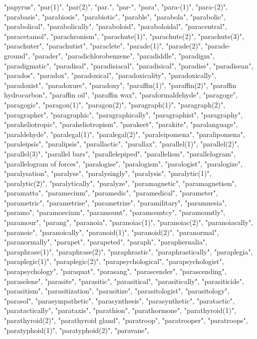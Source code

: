 "papyrus",
"par(1)",
"par(2)",
"par.",
"par-",
"para",
"para-(1)",
"para-(2)",
"parabasis",
"parabiosis",
"parabiotic",
"parable",
"parabola",
"parabolic",
"parabolical",
"parabolically",
"paraboloid",
"paraboloidal",
"paracentral",
"paracetamol",
"parachronism",
"parachute(1)",
"parachute(2)",
"parachute(3)",
"parachuter",
"parachutist",
"paraclete",
"parade(1)",
"parade(2)",
"parade-ground",
"parader",
"paradichlorobenzene",
"paradiddle",
"paradigm",
"paradigmatic",
"paradisal",
"paradisiacal",
"paradisical",
"paradise",
"paradisean",
"parados",
"paradox",
"paradoxical",
"paradoxicality",
"paradoxically",
"paradoxist",
"paradoxure",
"paradoxy",
"paraffin(1)",
"paraffin(2)",
"paraffin hydrocarbon",
"paraffin oil",
"paraffin wax",
"paraformaldehyde",
"paragoge",
"paragogic",
"paragon(1)",
"paragon(2)",
"paragraph(1)",
"paragraph(2)",
"paragrapher",
"paragraphic",
"paragraphically",
"paragraphist",
"paragraphy",
"paraheliotropic",
"paraheliotropism",
"parakeet",
"parakite",
"paralanguage",
"paraldehyde",
"paralegal(1)",
"paralegal(2)",
"paraleipomena",
"paralipomena",
"paraleipsis",
"paralipsis",
"parallactic",
"parallax",
"parallel(1)",
"parallel(2)",
"parallel(3)",
"parallel bars",
"parallelepiped",
"parallelism",
"parallelogram",
"parallelogram of forces",
"paralogise",
"paralogism",
"paralogist",
"paralogize",
"paralysation",
"paralyse",
"paralysingly",
"paralysis",
"paralytic(1)",
"paralytic(2)",
"paralytically",
"paralyze",
"paramagnetic",
"paramagnetism",
"paramatta",
"paramecium",
"paramedic",
"paramedical",
"parameter",
"parametric",
"parametrise",
"parametrize",
"paramilitary",
"paramnesia",
"paramo",
"paramoecium",
"paramount",
"paramountcy",
"paramountly",
"paramour",
"parang",
"paranoia",
"paranoiac(1)",
"paranoiac(2)",
"paranoiacally",
"paranoic",
"paranoically",
"paranoid(1)",
"paranoid(2)",
"paranormal",
"paranormally",
"parapet",
"parapeted",
"paraph",
"paraphernalia",
"paraphrase(1)",
"paraphrase(2)",
"paraphrastic",
"paraphrastically",
"paraplegia",
"paraplegic(1)",
"paraplegic(2)",
"parapsychological",
"parapsychologist",
"parapsychology",
"paraquat",
"parasang",
"parascender",
"parascending",
"paraselene",
"parasite",
"parasitic",
"parasitical",
"parasitically",
"parasiticide",
"parasitism",
"parasitization",
"parasitize",
"parasitologist",
"parasitology",
"parasol",
"parasympathetic",
"parasynthesis",
"parasynthetic",
"paratactic",
"paratactically",
"parataxis",
"parathion",
"parathormone",
"parathyroid(1)",
"parathyroid(2)",
"parathyroid gland",
"paratroop",
"paratrooper",
"paratroops",
"paratyphoid(1)",
"paratyphoid(2)",
"paravane",
